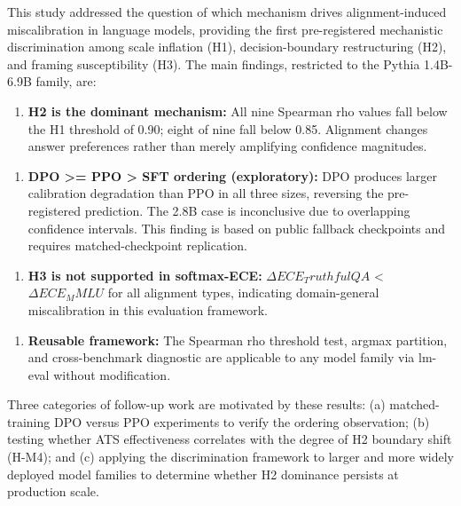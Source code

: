 
This study addressed the question of which mechanism drives alignment-induced miscalibration in language models, providing the first pre-registered mechanistic discrimination among scale inflation (H1), decision-boundary restructuring (H2), and framing susceptibility (H3). The main findings, restricted to the Pythia 1.4B-6.9B family, are:

\begin{enumerate}
\item \textbf{H2 is the dominant mechanism:} All nine Spearman rho values fall below the H1 threshold of 0.90; eight of nine fall below 0.85. Alignment changes answer preferences rather than merely amplifying confidence magnitudes.
\end{enumerate}

\begin{enumerate}
\item \textbf{DPO >= PPO > SFT ordering (exploratory):} DPO produces larger calibration degradation than PPO in all three sizes, reversing the pre-registered prediction. The 2.8B case is inconclusive due to overlapping confidence intervals. This finding is based on public fallback checkpoints and requires matched-checkpoint replication.
\end{enumerate}

\begin{enumerate}
\item \textbf{H3 is not supported in softmax-ECE:} $\Delta ECE_TruthfulQA$ < $\Delta ECE_MMLU$ for all alignment types, indicating domain-general miscalibration in this evaluation framework.
\end{enumerate}

\begin{enumerate}
\item \textbf{Reusable framework:} The Spearman rho threshold test, argmax partition, and cross-benchmark diagnostic are applicable to any model family via lm-eval without modification.
\end{enumerate}

Three categories of follow-up work are motivated by these results: (a) matched-training DPO versus PPO experiments to verify the ordering observation; (b) testing whether ATS effectiveness correlates with the degree of H2 boundary shift (H-M4); and (c) applying the discrimination framework to larger and more widely deployed model families to determine whether H2 dominance persists at production scale.

